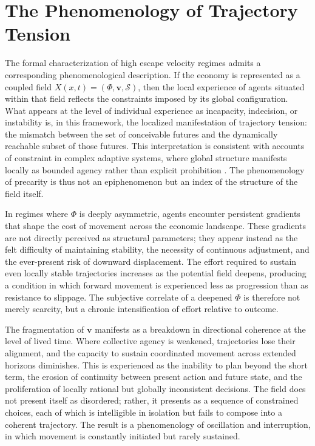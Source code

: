 \documentclass[11pt, a4paper]{article}
\begin{document}
\section{The Phenomenology of Trajectory Tension}

The formal characterization of high escape velocity regimes admits a corresponding phenomenological description. If the economy is represented as a coupled field $X(x,t) = (\Phi, \mathbf{v}, \mathcal{S})$, then the local experience of agents situated within that field reflects the constraints imposed by its global configuration. What appears at the level of individual experience as incapacity, indecision, or instability is, in this framework, the localized manifestation of trajectory tension: the mismatch between the set of conceivable futures and the dynamically reachable subset of those futures. This interpretation is consistent with accounts of constraint in complex adaptive systems, where global structure manifests locally as bounded agency rather than explicit prohibition \cite{holland1992}. The phenomenology of precarity is thus not an epiphenomenon but an index of the structure of the field itself.

In regimes where $\Phi$ is deeply asymmetric, agents encounter persistent gradients that shape the cost of movement across the economic landscape. These gradients are not directly perceived as structural parameters; they appear instead as the felt difficulty of maintaining stability, the necessity of continuous adjustment, and the ever-present risk of downward displacement. The effort required to sustain even locally stable trajectories increases as the potential field deepens, producing a condition in which forward movement is experienced less as progression than as resistance to slippage. The subjective correlate of a deepened $\Phi$ is therefore not merely scarcity, but a chronic intensification of effort relative to outcome.

The fragmentation of $\mathbf{v}$ manifests as a breakdown in directional coherence at the level of lived time. Where collective agency is weakened, trajectories lose their alignment, and the capacity to sustain coordinated movement across extended horizons diminishes. This is experienced as the inability to plan beyond the short term, the erosion of continuity between present action and future state, and the proliferation of locally rational but globally inconsistent decisions. The field does not present itself as disordered; rather, it presents as a sequence of constrained choices, each of which is intelligible in isolation but fails to compose into a coherent trajectory. The result is a phenomenology of oscillation and interruption, in which movement is constantly initiated but rarely sustained.
\end{document}
